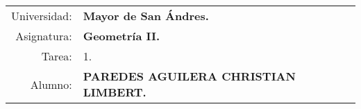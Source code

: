 \begin{tabular}{r l }
Universidad: & \textbf{Mayor de San Ándres.}\\
Asignatura: & \textbf{Geometría II.}\\
Tarea: & 1.\\ 
Alumno: & \textbf{PAREDES AGUILERA CHRISTIAN LIMBERT.}
\end{tabular}
\begin{flushleft}
\end{flushleft}
\vspace{.2cm}
